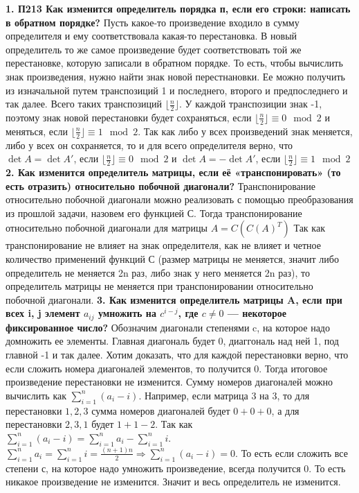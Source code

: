 \documentclass[12pt, a4paper]{article}
\begin{document}
	\textbf{1. П213 Как изменится определитель порядка п, если его строки: написать в обратном порядке?} \sspace
	Пусть какое-то произведение входило в сумму определителя и ему соответствовала какая-то перестановка. В новый определитель то же самое произведение будет соответствовать той же перестановке, которую записали в обратном порядке. То есть, чтобы вычислить знак произведения, нужно найти знак новой перестнановки. Ее можно получить из изначальной путем транспозиций 1 и последнего, второго и предпоследнего и так далее. Всего таких транспозиций $\lfloor \frac{n}{2} \rfloor$. У каждой транспозиции знак -1, поэтому знак новой перестановки будет сохраняться, если $\lfloor \frac{n}{2} \rfloor \equiv 0 \mod 2$ и меняться, если $\lfloor \frac{n}{2} \rfloor \equiv 1 \mod 2$. Так как либо у всех произведений знак меняется, либо у всех он сохраняется, то и для всего определителя верно, что $\det A = \det A'$, если $\lfloor \frac{n}{2} \rfloor \equiv 0 \mod 2$ и $\det A = -\det A'$, если $\lfloor \frac{n}{2} \rfloor \equiv 1 \mod 2$ \sspace
	\textbf{2. Как изменится определитель матрицы, если её «транспонировать» (то есть отразить) относительно побочной диагонали?} \sspace
	Транспонирование относительно побочной диагонали можно реализовать с помощью преобразования из прошлой задачи, назовем его функцией С. Тогда транспонирование относительно побочной диагонали для матрицы $A = C(C(A)^T)$ Так как транспонирование не влияет на знак определителя, как не влияет и четное количество применений функций С (размер матрицы не меняется, значит либо определитель не меняется 2n раз, либо знак у него меняется 2n раз), то определитель матрицы не меняется при транспонировании относительно побочной диагонали. \sspace
	\textbf{3. Как изменится определитель матрицы A, если при всех i, j элемент $a_{ij}$ умножить на $c^{i-j}$, где $c \neq 0$ — некоторое фиксированное число?} \sspace
	Обозначим диагонали степенями c, на которое надо домножить ее элементы. Главная диагональ будет 0, диаггональ над ней 1, под главной -1 и так далее. Хотим доказать, что для каждой перестановки верно, что если сложить номера диагоналей элементов, то получится 0. Тогда итоговое произведение перестановки не изменится. Сумму номеров диагоналей можно вычислить как $\sum_{i=1}^{n} (a_i - i)$. Например, если матрица 3 на 3, то для перестановки $1,2,3$ сумма номеров диагоналей будет $0 + 0 + 0$, а для перестановки $2,3,1$ будет $1 + 1 - 2$. Так как $\sum_{i=1}^{n} (a_i - i )= \sum_{i = 1}^{n} a_i - \sum_{i = 1}^{n} i$. $\sum_{i = 1}^{n} a_i = \sum_{i = 1}^{n} i = \frac{(n + 1)n}{2} \Rightarrow \sum_{i=1}^{n} (a_i - i) = 0$. То есть если сложить все степени с, на которое надо умножить произведение, всегда получится 0. То есть никакое произведение не изменится. Значит и весь определитель не изменится. \sspace
\end{document}
